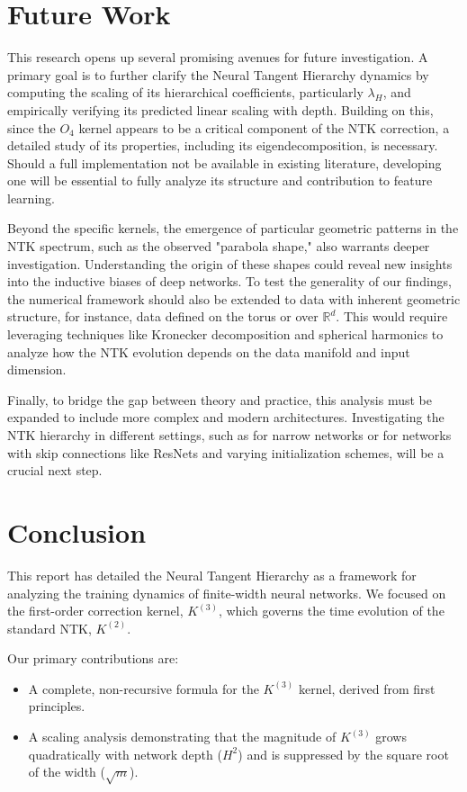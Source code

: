 \documentclass{article}
\begin{document}
\section{Future Work}
This research opens up several promising avenues for future investigation. A primary goal is to further clarify the Neural Tangent Hierarchy dynamics by computing the scaling of its hierarchical coefficients, particularly $\lambda_H$, and empirically verifying its predicted linear scaling with depth. Building on this, since the $O_4$ kernel appears to be a critical component of the NTK correction, a detailed study of its properties, including its eigendecomposition, is necessary. Should a full implementation not be available in existing literature, developing one will be essential to fully analyze its structure and contribution to feature learning.

Beyond the specific kernels, the emergence of particular geometric patterns in the NTK spectrum, such as the observed "parabola shape," also warrants deeper investigation. Understanding the origin of these shapes could reveal new insights into the inductive biases of deep networks. To test the generality of our findings, the numerical framework should also be extended to data with inherent geometric structure, for instance, data defined on the torus or over $\mathbb{R}^d$. This would require leveraging techniques like Kronecker decomposition and spherical harmonics to analyze how the NTK evolution depends on the data manifold and input dimension.

Finally, to bridge the gap between theory and practice, this analysis must be expanded to include more complex and modern architectures. Investigating the NTK hierarchy in different settings, such as for narrow networks or for networks with skip connections like ResNets and varying initialization schemes, will be a crucial next step.

\section{Conclusion}

This report has detailed the Neural Tangent Hierarchy as a framework for analyzing the training dynamics of finite-width neural networks. We focused on the first-order correction kernel, $K^{(3)}$, which governs the time evolution of the standard NTK, $K^{(2)}$.

Our primary contributions are:
\begin{itemize}
    \item A complete, non-recursive formula for the $K^{(3)}$ kernel, derived from first principles.
    \item A scaling analysis demonstrating that the magnitude of $K^{(3)}$ grows quadratically with network depth ($H^2$) and is suppressed by the square root of the width ($\sqrt{m}$).
\end{itemize}
\end{document}
